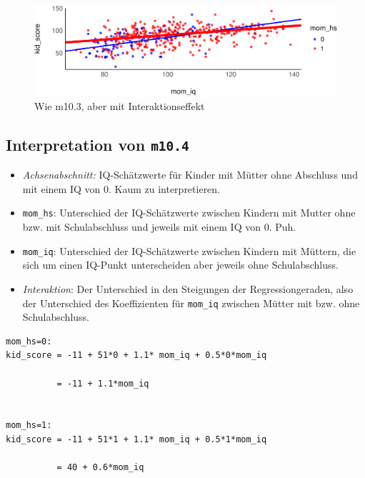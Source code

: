\documentclass[
  a4paper,
  DIV=11]{scrreprt}
\providecommand{\tightlist}{%
  \setlength{\itemsep}{0pt}\setlength{\parskip}{0pt}}\usepackage{longtable,booktabs,array}
\theoremstyle{definition}
\theoremstyle{remark}
\begin{document}
\begin{figure}

{\centering \includegraphics{./metrische-AV_files/figure-pdf/fig-m104-1.pdf}

}

\caption{\label{fig-m104}Wie m10.3, aber mit Interaktionseffekt}

\end{figure}

\hypertarget{interpretation-von-m10.4}{%
\subsection{\texorpdfstring{Interpretation von
\texttt{m10.4}}{Interpretation von m10.4}}\label{interpretation-von-m10.4}}

\begin{itemize}
\tightlist
\item
  \emph{Achsenabschnitt:} IQ-Schätzwerte für Kinder mit Mütter ohne
  Abschluss und mit einem IQ von 0. Kaum zu interpretieren.
\item
  \texttt{mom\_hs}: Unterschied der IQ-Schätzwerte zwischen Kindern mit
  Mutter ohne bzw. mit Schulabschluss und jeweils mit einem IQ von 0.
  Puh.
\item
  \texttt{mom\_iq}: Unterschied der IQ-Schätzwerte zwischen Kindern mit
  Müttern, die sich um einen IQ-Punkt unterscheiden aber jeweils ohne
  Schulabschluss.
\item
  \emph{Interaktion}: Der Unterschied in den Steigungen der
  Regressiongeraden, also der Unterschied des Koeffizienten für
  \texttt{mom\_iq} zwischen Mütter mit bzw. ohne Schulabschluss.
\end{itemize}

\begin{verbatim}
mom_hs=0:
kid_score = -11 + 51*0 + 1.1* mom_iq + 0.5*0*mom_iq

          = -11 + 1.1*mom_iq


mom_hs=1: 
kid_score = -11 + 51*1 + 1.1* mom_iq + 0.5*1*mom_iq

          = 40 + 0.6*mom_iq
\end{verbatim}
\end{document}
